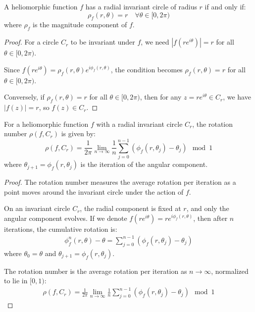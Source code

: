 \begin{definition}
\begin{enumerate}
\begin{definition}
\begin{definition}
\begin{theorem}
A heliomorphic function $f$ has a radial invariant circle of radius $r$ if and only if:
\begin{equation}
\rho_f(r,\theta) = r \quad \forall \theta \in [0, 2\pi)
\end{equation}
where $\rho_f$ is the magnitude component of $f$.
\end{theorem}

\begin{proof}
For a circle $C_r$ to be invariant under $f$, we need $|f(re^{i\theta})| = r$ for all $\theta \in [0, 2\pi)$.

Since $f(re^{i\theta}) = \rho_f(r,\theta)e^{i\phi_f(r,\theta)}$, the condition becomes $\rho_f(r,\theta) = r$ for all $\theta \in [0, 2\pi)$.

Conversely, if $\rho_f(r,\theta) = r$ for all $\theta \in [0, 2\pi)$, then for any $z = re^{i\theta} \in C_r$, we have $|f(z)| = r$, so $f(z) \in C_r$.
\end{proof}

\begin{theorem}
For a heliomorphic function $f$ with a radial invariant circle $C_r$, the rotation number $\rho(f, C_r)$ is given by:
\begin{equation}
\rho(f, C_r) = \frac{1}{2\pi}\lim_{n\to\infty}\frac{1}{n}\sum_{j=0}^{n-1}(\phi_f(r, \theta_j) - \theta_j) \mod 1
\end{equation}
where $\theta_{j+1} = \phi_f(r, \theta_j)$ is the iteration of the angular component.
\end{theorem}

\begin{proof}
The rotation number measures the average rotation per iteration as a point moves around the invariant circle under the action of $f$.

On an invariant circle $C_r$, the radial component is fixed at $r$, and only the angular component evolves. If we denote $f(re^{i\theta}) = re^{i\phi_f(r,\theta)}$, then after $n$ iterations, the cumulative rotation is:
\begin{align}
\phi_f^n(r,\theta) - \theta = \sum_{j=0}^{n-1}(\phi_f(r, \theta_j) - \theta_j)
\end{align}
where $\theta_0 = \theta$ and $\theta_{j+1} = \phi_f(r, \theta_j)$.

The rotation number is the average rotation per iteration as $n \to \infty$, normalized to lie in $[0, 1)$:
\begin{align}
\rho(f, C_r) = \frac{1}{2\pi}\lim_{n\to\infty}\frac{1}{n}\sum_{j=0}^{n-1}(\phi_f(r, \theta_j) - \theta_j) \mod 1
\end{align}
\end{proof}


\end{definition}
\end{definition}
\end{enumerate}
\end{definition}

